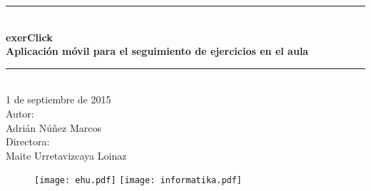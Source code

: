 \pagestyle{empty}

\newcommand{\HRule}{\rule{\linewidth}{0.5mm}} 

\begin{center}
	\HRule \\[0.5cm]
	\vspace{0.5cm}
	\textbf {
		{\huge exerClick}\\
		\vspace{0.3 cm}
		Aplicación móvil para el seguimiento de ejercicios en el aula\\
	}
	\vspace{0.5cm}
	\HRule \\[2.0cm]
	{\large
		1 de septiembre de 2015\\
		\vspace{2.0 cm}
		Autor:\\
		Adrián Núñez Marcos\\
		\vspace{1.0 cm}
		Directora:\\
		Maite Urretavizcaya Loinaz\\
	}

	\vspace{2.0 cm} 
	\begin{figure}[h!]
		\centering
		\texttt{[image: ehu.pdf]}\hfill
		\texttt{[image: informatika.pdf]}
	\end{figure}
\end{center}
